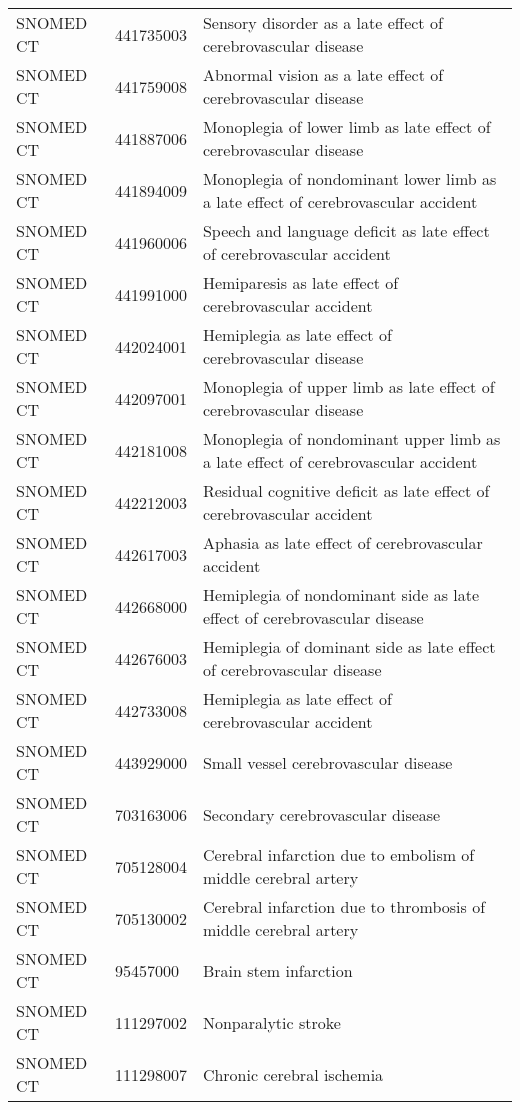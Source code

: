 \begin{longtable}{p{}p{}p{}}
  SNOMED CT & 441735003 & Sensory disorder as a late effect of cerebrovascular disease \\ 
  SNOMED CT & 441759008 & Abnormal vision as a late effect of cerebrovascular disease \\ 
  SNOMED CT & 441887006 & Monoplegia of lower limb as late effect of cerebrovascular disease \\ 
  SNOMED CT & 441894009 & Monoplegia of nondominant lower limb as a late effect of cerebrovascular accident \\ 
  SNOMED CT & 441960006 & Speech and language deficit as late effect of cerebrovascular accident \\ 
  SNOMED CT & 441991000 & Hemiparesis as late effect of cerebrovascular accident \\ 
  SNOMED CT & 442024001 & Hemiplegia as late effect of cerebrovascular disease \\ 
  SNOMED CT & 442097001 & Monoplegia of upper limb as late effect of cerebrovascular disease \\ 
  SNOMED CT & 442181008 & Monoplegia of nondominant upper limb as a late effect of cerebrovascular accident \\ 
  SNOMED CT & 442212003 & Residual cognitive deficit as late effect of cerebrovascular accident \\ 
  SNOMED CT & 442617003 & Aphasia as late effect of cerebrovascular accident \\ 
  SNOMED CT & 442668000 & Hemiplegia of nondominant side as late effect of cerebrovascular disease \\ 
  SNOMED CT & 442676003 & Hemiplegia of dominant side as late effect of cerebrovascular disease \\ 
  SNOMED CT & 442733008 & Hemiplegia as late effect of cerebrovascular accident \\ 
  SNOMED CT & 443929000 & Small vessel cerebrovascular disease \\ 
  SNOMED CT & 703163006 & Secondary cerebrovascular disease \\ 
  SNOMED CT & 705128004 & Cerebral infarction due to embolism of middle cerebral artery \\ 
  SNOMED CT & 705130002 & Cerebral infarction due to thrombosis of middle cerebral artery \\ 
  SNOMED CT & 95457000 & Brain stem infarction \\ 
  SNOMED CT & 111297002 & Nonparalytic stroke \\ 
  SNOMED CT & 111298007 & Chronic cerebral ischemia \\ 

\end{longtable}
